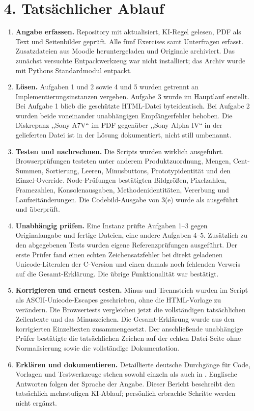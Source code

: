 \documentclass[11pt,a4paper]{article}
\newcommand{\datei}[1]{\texttt{\detokenize{#1}}}
\begin{document}
\section*{4. Tatsächlicher Ablauf}
\begin{enumerate}
\item \textbf{Angabe erfassen.} Repository mit \datei{git pull --ff-only} aktualisiert, KI-Regel gelesen, PDF als Text und Seitenbilder geprüft. Alle fünf Exercises samt Unterfragen erfasst. Zusatzdateien aus Moodle heruntergeladen und Originale archiviert. Das zunächst versuchte Entpackwerkzeug war nicht installiert; das Archiv wurde mit Pythons Standardmodul entpackt.
\item \textbf{Lösen.} Aufgaben 1 und 2 sowie 4 und 5 wurden getrennt an Implementierungsinstanzen vergeben. Aufgabe 3 wurde im Hauptlauf erstellt. Bei Aufgabe 1 blieb die geschützte HTML-Datei byteidentisch. Bei Aufgabe 2 wurden beide voneinander unabhängigen Empfängerfehler behoben. Die Diskrepanz ,,Sony A7V`` im PDF gegenüber ,,Sony Alpha IV`` in der gelieferten Datei ist in der Lösung dokumentiert, nicht still umbenannt.
\item \textbf{Testen und nachrechnen.} Die Scripts wurden wirklich ausgeführt. Browserprüfungen testeten unter anderem Produktzuordnung, Mengen, Cent-Summen, Sortierung, Leeren, Minusbuttons, Prototypidentität und den Einzel-Override. Node-Prüfungen bestätigten Bildgrößen, Pixelzahlen, Framezahlen, Konsolenausgaben, Methodenidentitäten, Vererbung und Laufzeitänderungen. Die Codebild-Ausgabe von 3(e) wurde als \datei{20, 21, 21, 16} ausgeführt und überprüft.
\item \textbf{Unabhängig prüfen.} Eine Instanz prüfte Aufgaben 1--3 gegen Originalangabe und fertige Dateien, eine andere Aufgaben 4--5. Zusätzlich zu den abgegebenen Tests wurden eigene Referenzprüfungen ausgeführt. Der erste Prüfer fand einen echten Zeichensatzfehler bei direkt geladenen Unicode-Literalen der C-Version und einen damals noch fehlenden Verweis auf die Gesamt-Erklärung. Die übrige Funktionalität war bestätigt.
\item \textbf{Korrigieren und erneut testen.} Minus und Trennstrich wurden im Script als ASCII-Unicode-Escapes geschrieben, ohne die HTML-Vorlage zu verändern. Die Browsertests vergleichen jetzt die vollständigen tatsächlichen Zeilentexte und das Minuszeichen. Die Gesamt-Erklärung wurde aus den korrigierten Einzeltexten zusammengesetzt. Der anschließende unabhängige Prüfer bestätigte die tatsächlichen Zeichen auf der echten Datei-Seite ohne Normalisierung sowie die vollständige Dokumentation.
\item \textbf{Erklären und dokumentieren.} Detaillierte deutsche Durchgänge für Code, Vorlagen und Testwerkzeuge stehen sowohl einzeln als auch in \datei{erklaerung_blatt04.md}. Englische Antworten folgen der Sprache der Angabe. Dieser Bericht beschreibt den tatsächlich mehrstufigen KI-Ablauf; persönlich erbrachte Schritte werden nicht ergänzt.
\end{enumerate}
\end{document}
